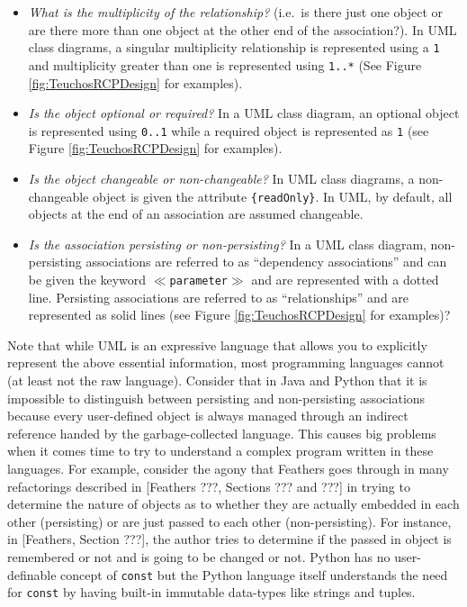 \documentclass[pdf,ps2pdf,11pt]{SANDreport}
\begin{document}
\begin{itemize}

{}\item\textit{What is the multiplicity of the relationship?}  (i.e.\
is there just one object or are there more than one object at the
other end of the association?).  In UML class diagrams, a singular
multiplicity relationship is represented using a {}\texttt{1} and
multiplicity greater than one is represented using {}\texttt{1..*}
(See Figure {}\ref{fig:TeuchosRCPDesign} for examples).

{}\item\textit{Is the object optional or required?}  In a UML class
diagram, an optional object is represented using {}\texttt{0..1} while
a required object is represented as {}\texttt{1} (see Figure
{}\ref{fig:TeuchosRCPDesign} for examples).

{}\item\textit{Is the object changeable or non-changeable?}  In UML
class diagrams, a non-changeable object is given the attribute
{}\texttt{\{readOnly\}}.  In UML, by default, all objects at the end
of an association are assumed changeable.

{}\item\textit{Is the association persisting or non-persisting?}  In a
UML class diagram, non-persisting associations are referred to as
``dependency associations'' and can be given the keyword
{}\texttt{$\ll$parameter$\gg$} and are represented with a dotted line.
Persisting associations are referred to as ``relationships'' and are
represented as solid lines (see Figure {}\ref{fig:TeuchosRCPDesign}
for examples)?

\end{itemize}

Note that while UML is an expressive language that allows you to
explicitly represent the above essential information, most
programming languages cannot (at least not the raw language).
Consider that in Java and Python that it is impossible to distinguish
between persisting and non-persisting associations because every
user-defined object is always managed through an indirect reference
handed by the garbage-collected language.  This causes big problems
when it comes time to try to understand a complex program written in
these languages.  For example, consider the agony that Feathers goes
through in many refactorings described in [Feathers ???, Sections ??? 
and ???] in trying to determine the nature of objects as to whether
they are actually embedded in each other (persisting) or are just
passed to each other (non-persisting).  For instance, in [Feathers,
Section ???], the author tries to determine if the passed in object is
remembered or not and is going to be changed or not.  Python has no
user-definable concept of {}\texttt{const} but the Python language
itself understands the need for {}\texttt{const} by having built-in
immutable data-types like strings and tuples.
\end{document}
